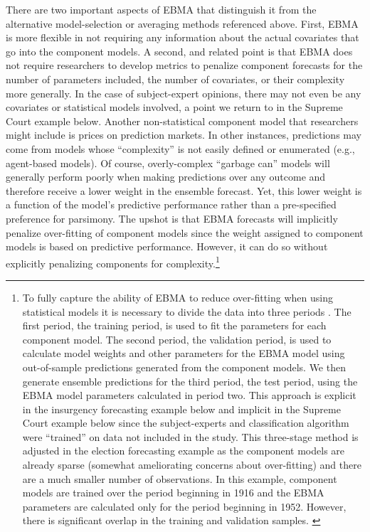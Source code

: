 \documentclass[12pt,fullpage,endnotes]{article}
\newcommand{\note}[1]{\footnote{ #1 \vspace{4 mm}}}
\begin{document}
There are two important aspects of EBMA that distinguish it from the
alternative model-selection or averaging methods referenced above.
First, EBMA is more flexible in not requiring any information about
the actual covariates that go into the component models. A second, and
related point is that EBMA does not require researchers to develop
metrics to penalize component forecasts for the number of parameters
included, the number of covariates, or their complexity more
generally.  In the case of subject-expert opinions, there may not even
be any covariates or statistical models involved, a point we return to
in the Supreme Court example below. Another non-statistical component
model that researchers might include is prices on prediction markets.
In other instances, predictions may come from models whose
``complexity'' is not easily defined or enumerated (e.g., agent-based
models).  Of course, overly-complex ``garbage can'' models will
generally perform poorly when making predictions over any outcome and
therefore receive a lower weight in the ensemble forecast.  Yet, this
lower weight is a function of the model's predictive performance
rather than a pre-specified preference for parsimony.  The upshot is
that EBMA forecasts will implicitly penalize over-fitting of component
models since the weight assigned to component models is based on
predictive performance.  However, it can do so without explicitly
penalizing components for complexity.\note{To fully capture the
  ability of EBMA to reduce over-fitting when using statistical models
  it is necessary to divide the data into three periods
  \citep{Hastie:2009}.  The first period, the training period, is used
  to fit the parameters for each component model.  The second period,
  the validation period, is used to calculate model weights and other
  parameters for the EBMA model using out-of-sample predictions
  generated from the component models.  We then generate ensemble
  predictions for the third period, the test period, using the EBMA
  model parameters calculated in period two.  This approach is
  explicit in the insurgency forecasting example below and implicit in
  the Supreme Court example below since the subject-experts and
  classification algorithm were ``trained'' on data not included in
  the study. This three-stage method is adjusted in the election
  forecasting example as the component models are already sparse
  (somewhat ameliorating concerns about over-fitting) and there are a
  much smaller number of observations.  In this example, component
  models are trained over the period beginning in 1916 and the EBMA
  parameters are calculated only for the period beginning in 1952.
  However, there is significant overlap in the training and validation
  samples. \label{samples}}
\end{document}

